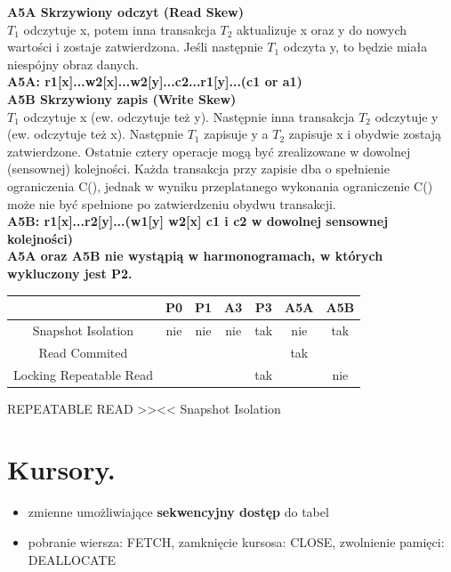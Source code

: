 \documentclass[a4paper]{article}
\begin{document}
    \textbf{A5A Skrzywiony odczyt (Read Skew)}\\
    $T_1$ odczytuje x, potem inna transakcja $T_2$ aktualizuje x
    oraz y do nowych wartości i zostaje zatwierdzona. Jeśli następnie $T_1$ odczyta y, to będzie miała niespójny obraz danych.\\
    \textbf{A5A: r1[x]...w2[x]...w2[y]...c2...r1[y]...(c1 or a1)}\\

    \textbf{A5B Skrzywiony zapis (Write Skew)}\\
    $T_1$ odczytuje x (ew. odczytuje też y). Następnie inna
    transakcja $T_2$ odczytuje y (ew. odczytuje też x). Następnie $T_1$ zapisuje y a $T_2$ zapisuje x i
    obydwie zostają zatwierdzone. Ostatnie cztery operacje mogą być zrealizowane w dowolnej (sensownej) kolejności. Każda transakcja przy zapisie dba o spełnienie ograniczenia C(),
    jednak w wyniku przeplatanego wykonania ograniczenie C() może nie być spełnione po zatwierdzeniu obydwu transakcji.\\
    \textbf{A5B: r1[x]...r2[y]...(w1[y] w2[x] c1 i c2 w dowolnej sensownej kolejności)}\\

    \textbf{A5A oraz A5B nie wystąpią w harmonogramach, w których wykluczony jest P2.}\\

    \begin{tabular}{|c|c|c|c|c|c|c|}
        \hline
        & P0 & P1 & A3 & P3 & A5A & A5B \\
        \hline
        Snapshot Isolation & nie & nie & nie & tak & nie & tak\\
        \hline
        Read Commited & & & & & tak & \\
        \hline
        Locking Repeatable Read & & & & tak & & nie\\
        \hline
    \end{tabular}

    REPEATABLE READ >><< Snapshot Isolation


    \section{Kursory.}
    \begin{itemize}
        \item zmienne umożliwiające \textbf{sekwencyjny dostęp} do tabel
        \item pobranie wiersza: FETCH, zamknięcie kursosa: CLOSE, zwolnienie pamięci: DEALLOCATE
    \end{itemize}
\end{document}
